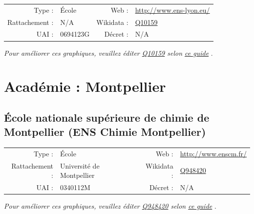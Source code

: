 \documentclass[11pt,french,landscape]{article}
\begin{document}
\begin{tabular*}{0.45\textwidth}{rp{2cm}rl}  
\hline  
Type : & École & Web : &\href{http://www.ens-lyon.eu/}{http://www.ens-lyon.eu/} \\  
Rattachement : & N/A & Wikidata : & \href{https://www.wikidata.org/entity/Q10159}{Q10159} \\  
UAI : & 0694123G & Décret : & N/A \\  
\hline  
\end{tabular*}

\textit{\scriptsize Pour améliorer ces graphiques, veuillez éditer \href{https://www.wikidata.org/entity/Q10159}{Q10159}  selon \href{https://github.com/cpesr/wikidataESR/blob/master/Rmd/wikidataESR.md}{ce guide}}
.


\newpage

\hypertarget{acaduxe9mie-montpellier-1}{%
\section{Académie : Montpellier}\label{acaduxe9mie-montpellier-1}}

\hypertarget{uxe9cole-nationale-supuxe9rieure-de-chimie-de-montpellier-ens-chimie-montpellier}{%
\subsection{École nationale supérieure de chimie de Montpellier (ENS
Chimie
Montpellier)}\label{uxe9cole-nationale-supuxe9rieure-de-chimie-de-montpellier-ens-chimie-montpellier}}

\begin{tabular*}{0.45\textwidth}{rp{2cm}rl}  
\hline  
Type : & École & Web : &\href{http://www.enscm.fr/}{http://www.enscm.fr/} \\  
Rattachement : & Université de Montpellier & Wikidata : & \href{https://www.wikidata.org/entity/Q948420}{Q948420} \\  
UAI : & 0340112M & Décret : & N/A \\  
\hline  
\end{tabular*}

\textit{\scriptsize Pour améliorer ces graphiques, veuillez éditer \href{https://www.wikidata.org/entity/Q948420}{Q948420}  selon \href{https://github.com/cpesr/wikidataESR/blob/master/Rmd/wikidataESR.md}{ce guide}}
.
\end{document}
